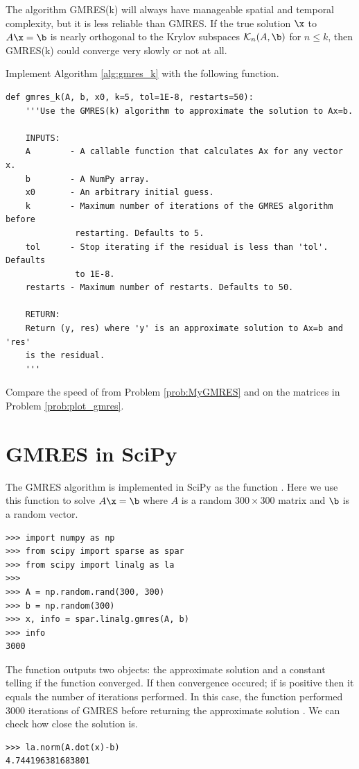 The algorithm GMRES(k) will always have manageable spatial and temporal complexity, but it is less reliable than GMRES.
If the true solution $\x$ to $A\x=\b$ is nearly orthogonal to the Krylov subspaces $\mathcal{K}_n(A, \b)$ for $n\leq k$, then GMRES(k) could converge very slowly or not at all.

\begin{problem}
Implement Algorithm \ref{alg:gmres_k} with the following function.
\begin{lstlisting}
def gmres_k(A, b, x0, k=5, tol=1E-8, restarts=50):
    '''Use the GMRES(k) algorithm to approximate the solution to Ax=b.
    
    INPUTS:
    A        - A callable function that calculates Ax for any vector x.
    b        - A NumPy array.
    x0       - An arbitrary initial guess.
    k        - Maximum number of iterations of the GMRES algorithm before 
              restarting. Defaults to 5.
    tol      - Stop iterating if the residual is less than 'tol'. Defaults 
              to 1E-8.
    restarts - Maximum number of restarts. Defaults to 50.
    
    RETURN:
    Return (y, res) where 'y' is an approximate solution to Ax=b and 'res' 
    is the residual.
    '''
\end{lstlisting}

Compare the speed of  from Problem \ref{prob:MyGMRES} and  on the matrices in Problem \ref{prob:plot_gmres}.
\label{prob:GMRES3}
\end{problem}

\section*{GMRES in SciPy}
The GMRES algorithm is implemented in SciPy as the function .
Here we use this function to solve $A\x=\b$ where $A$ is a random $300 \times 300$ matrix and $\b$ is a random vector.

\begin{lstlisting}
>>> import numpy as np
>>> from scipy import sparse as spar
>>> from scipy import linalg as la
>>>
>>> A = np.random.rand(300, 300)
>>> b = np.random(300)
>>> x, info = spar.linalg.gmres(A, b)
>>> info
3000
\end{lstlisting}

The function outputs two objects: the approximate solution  and a constant  telling if the function converged.
If  then convergence occured; if  is positive then it equals the number of iterations performed.
In this case, the function performed 3000 iterations of GMRES before returning the approximate solution .
We can check how close the solution is.
\begin{lstlisting}
>>> la.norm(A.dot(x)-b)
4.744196381683801
\end{lstlisting}

